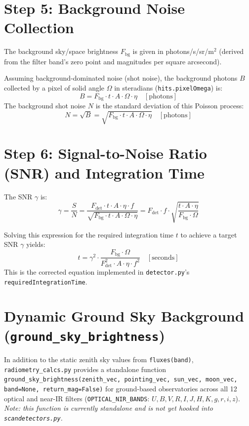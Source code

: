 \documentclass[11pt,a4paper]{article}
\begin{document}
\section{Step 5: Background Noise Collection}
The background sky/space brightness $F_{\text{bg}}$ is given in photons/s/sr/m$^2$ (derived from
the filter band's zero point and magnitudes per square arcsecond).

Assuming background-dominated noise (shot noise), the background photons $B$ collected by a pixel
of solid angle $\Omega$ in steradians (\texttt{hits.pixelOmega}) is:
\begin{equation}
    B = F_{\text{bg}} \cdot t \cdot A \cdot \Omega \cdot \eta \quad [\text{photons}]
\end{equation}
The background shot noise $N$ is the standard deviation of this Poisson process:
\begin{equation}
    N = \sqrt{B} = \sqrt{F_{\text{bg}} \cdot t \cdot A \cdot \Omega \cdot \eta} \quad [\text{photons}]
\end{equation}

\section{Step 6: Signal-to-Noise Ratio (SNR) and Integration Time}
The SNR $\gamma$ is:
\begin{equation}
    \gamma = \frac{S}{N} = \frac{F_{\text{det}} \cdot t \cdot A \cdot \eta \cdot f}{\sqrt{F_{\text{bg}} \cdot t \cdot A \cdot \Omega \cdot \eta}} = F_{\text{det}} \cdot f \cdot \sqrt{\frac{t \cdot A \cdot \eta}{F_{\text{bg}} \cdot \Omega}}
\end{equation}

Solving this expression for the required integration time $t$ to achieve a target SNR $\gamma$ yields:
\begin{equation}
    t = \gamma^2 \cdot \frac{F_{\text{bg}} \cdot \Omega}{F_{\text{det}}^2 \cdot A \cdot \eta \cdot f^2} \quad [\text{seconds}]
\end{equation}
This is the corrected equation implemented in \texttt{detector.py}'s \texttt{requiredIntegrationTime}.

\section{Dynamic Ground Sky Background (\texttt{ground\_sky\_brightness})}
In addition to the static zenith sky values from \texttt{fluxes(band)}, \texttt{radiometry\_calcs.py}
provides a standalone function \texttt{ground\_sky\_brightness(zenith\_vec, pointing\_vec, sun\_vec,
moon\_vec, band=None, return\_mag=False)} for ground-based observatories across all 12 optical and
near-IR filters (\texttt{OPTICAL\_NIR\_BANDS}: $U, B, V, R, I, J, H, K, g, r, i, z$).
\textit{Note: this function is currently standalone and is not yet hooked into
\texttt{scandetectors.py}.}
\end{document}
